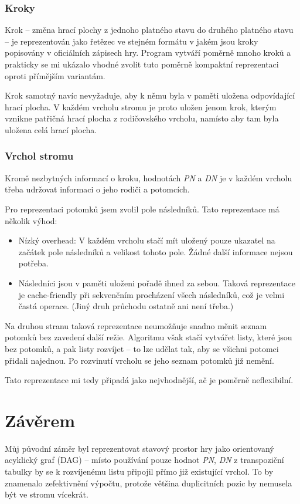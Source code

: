 \documentclass{article}
\begin{document}
\subsubsection{Kroky}
Krok -- změna hrací plochy z jednoho platného stavu do druhého platného stavu -- je reprezentován jako řetězec ve
stejném formátu v jakém jsou kroky popisovány v oficiálních zápisech hry. Program vytváří poměrně mnoho kroků a
prakticky se mi ukázalo vhodné zvolit tuto poměrně kompaktní reprezentaci oproti přímějším variantám.

Krok samotný navíc nevyžaduje, aby k němu byla v paměti uložena odpovídající hrací plocha. V každém vrcholu stromu je
proto uložen jenom krok, kterým vznikne patřičná hrací plocha z rodičovského vrcholu, namísto aby tam byla uložena celá
hrací plocha.

\subsubsection{Vrchol stromu}
Kromě nezbytných informací o kroku, hodnotách \emph{PN} a \emph{DN} je v každém vrcholu třeba udržovat informaci o jeho
rodiči a potomcích.

Pro reprezentaci potomků jsem zvolil pole následníků. Tato reprezentace má několik výhod:\begin{itemize}
  \item Nízký overhead: V každém vrcholu stačí mít uložený pouze ukazatel na začátek pole následníků a velikost tohoto
  pole. Žádné další informace nejsou potřeba.
  \item Následníci jsou v paměti uloženi pořadě ihned za sebou. Taková reprezentace je cache-friendly při sekvenčním
  procházení všech následníků, což je velmi častá operace. (Jiný druh průchodu ostatně ani není třeba.)
\end{itemize}

Na druhou stranu taková reprezentace neumožňuje snadno měnit seznam potomků bez zavedení další režie. Algoritmu však
stačí vytvářet listy, které jsou bez potomků, a pak listy rozvíjet -- to lze udělat tak, aby se všichni potomci přidali
najednou. Po rozvinutí vrcholu se jeho seznam potomků již nemění.

Tato reprezentace mi tedy připadá jako nejvhodnější, ač je poměrně neflexibilní.

\section{Závěrem}
Můj původní záměr byl reprezentovat stavový prostor hry jako orientovaný acyklický graf (DAG) -- místo používání pouze
hodnot \emph{PN}, \emph{DN} z transpoziční tabulky by se k rozvíjenému listu připojil přímo již existující vrchol. To by
znamenalo zefektivnění výpočtu, protože většina duplicitních pozic by nemusela být ve stromu vícekrát.
\end{document}
